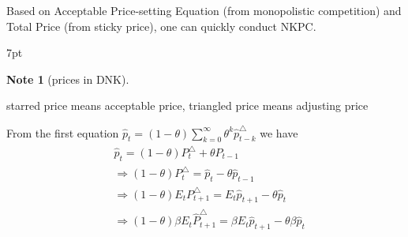 \documentclass{article}
\newenvironment{blueblock}{
\def\FrameCommand{
  \hspace{1pt}
    {\color{DarkBlue}
    \vrule width 2pt}
    {\color{blueshade}
    \vrule width 4pt}
  \colorbox{blueshade}
}
\MakeFramed{
  \advance
  \hsize-
  \width
  \FrameRestore}
\noindent\hspace{-4.55pt}%
\begin{adjustwidth}{}{7pt}
\vspace{2pt}\vspace{2pt}
}
{\vspace{2pt}\end{adjustwidth}\endMakeFramed}
\newtheorem{note}{Note}
\begin{document}
Based on Acceptable Price-setting Equation (from monopolistic competition) and Total Price (from sticky price), one can quickly conduct NKPC.

\begin{blueblock}
\begin{note}[prices in DNK]
\end{note}
starred price means acceptable price, triangled price means adjusting price
\end{blueblock}


From the first equation $\hat p_t=(1-\theta) \sum\limits_{k=0}^\infty \theta^k \hat p_{t-k}^\triangle$ we have
\begin{align}
& \hat p_t =(1-\theta)P_t^\triangle+\theta P_{t-1}
\\& \Rightarrow (1-\theta)P_t^\triangle=\hat p_t - \theta \hat p_{t-1}
\\& \Rightarrow (1-\theta)E_t P_{t+1}^\triangle=E_t \hat p_{t+1} - \theta \hat p_t
\\& \Rightarrow (1-\theta)\beta E_t \hat P_{t+1}^\triangle=\beta E_t \hat p_{t+1} - \theta \beta \hat p_t
\end{align}
\end{document}
